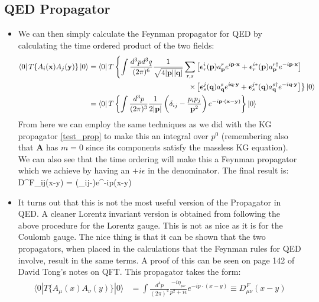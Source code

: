 \documentclass[11pt]{article}
\renewenvironment{flalign}{\vspace{-2mm}\empheq[box=\tcbhighmath]{align}}{\endempheq}
\numberwithin{equation}{section}
\begin{document}
\subsection{QED Propagator} %
\label{sub:qed_propagator}
\begin{itemize}
  \item We can then simply calculate the Feynman propagator for QED by calculating the time ordered product of the two fields:
  \begin{align*}
    \bra{0}T\{A_i(\textbf{x})A_j(\textbf{y})\}\ket{0} &=   \bra{0}T\left\{\int \frac{d^3pd^3q}{(2\pi)^6}\frac{1}{\sqrt{4|\textbf{p}||\textbf{q}|}}\sum_{r,s}\left[\boldsymbol{\epsilon}^i_{r}(\textbf{p})a^{r}_{\textbf{p}}e^{i\textbf{p}\cdot\textbf{x}}+\boldsymbol{\epsilon}^{i\ast}_{r}(\textbf{p})a^{r\dagger}_{\textbf{p}}e^{-i\textbf{p}\cdot\textbf{x}}\right] \right.\\
     &~~~~~~~~~~~~~~~~~~~~~~~~~~~~~~~~~~~~~~~~\left.\times\left[\boldsymbol{\epsilon}^j_{s}(\textbf{q})a^{s}_{\textbf{q}}e^{i\textbf{q}\cdot\textbf{y}}+\boldsymbol{\epsilon}^{j\ast}_{s}(\textbf{q})a^{s\dagger}_{\textbf{q}}e^{-i\textbf{q}\cdot\textbf{y}}\right] \right\}\ket{0} \\
     & = \bra{0}T\left\{\int \frac{d^3p}{(2\pi)^3}\frac{1}{2|\textbf{p}|}\left(\delta_{ij}-\frac{p_ip_j}{\textbf{p}^2}\right)e^{-i\textbf{p}\cdot(\textbf{x}-\textbf{y})} \right\}\ket{0}
  \end{align*}
  From here we can employ the same techniques as we did with the KG propagator \ref{test_prop} to make this an integral over $p^0$ (remembering also that $\textbf{A}$ has $m=0$ since its components satisfy the massless KG equation). We can also see that the time ordering will make this a Feynman propagator which we achieve by having an $+i\epsilon$ in the denominator. The final result is:
  \begin{flalign}
      D^F_{ij}(x-y) = \int {}\left(\delta_{ij}-\right)e^{-ip\cdot(x-y)}
    \end{flalign} 
    \item It turns out that this is not the most useful version of the Propagator in QED. A cleaner Lorentz invariant version is obtained from following the above procedure for the Lorentz gauge. This is not as nice as it is for the Coulomb gauge. The nice thing is that it can be shown that the two propagators, when placed in the calculations that the Feynman rules for QED involve, result in the same terms. A proof of this can be seen on page 142 of David Tong's notes on QFT. This propagator takes the form:
    \begin{align}
    \label{A_contract}
    \langle 0 | T \{A_\mu(x) A_\nu(y)\} | 0 \rangle &= \int \frac{d^4p}{(2\pi)^4} \frac{-i \eta_{\mu\nu}}{p^2 + i\epsilon} e^{-ip \cdot (x - y)} \equiv D^F_{\mu\nu}(x-y)
\end{align}  
\end{itemize}
\end{document}
